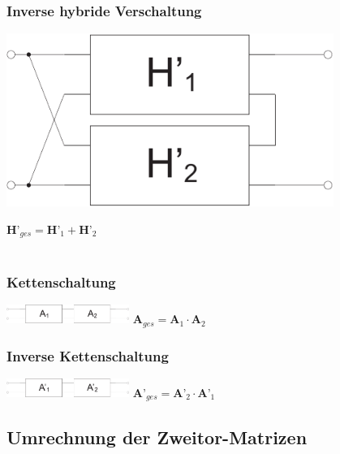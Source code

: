 \documentclass[a4paper,twocolumn,10pt]{article}
\begin{document}
\subsubsection*{Inverse hybride Verschaltung}
\begin{minipage}[b]{0.23\textwidth}
\includegraphics[width=0.8\textwidth]{Grafiken/Zweitor_inversHybrid}
\end{minipage}
\hfill
\begin{minipage}[b]{0.23\textwidth}
$\textbf{H'}_{ges}=\textbf{H'}_1+\textbf{H'}_2$\\\\
\end{minipage}

\subsubsection*{Kettenschaltung}
\includegraphics[width=0.3\textwidth, keepaspectratio]{Grafiken/Zweitor_Kette}
$\textbf{A}_{ges}=\textbf{A}_1\cdot \textbf{A}_2$

\subsubsection*{Inverse Kettenschaltung}
\includegraphics[width=0.3\textwidth]{Grafiken/Zweitor_inversKette}
$\textbf{A'}_{ges}=\textbf{A'}_2\cdot \textbf{A'}_1$

\subsection*{Umrechnung der Zweitor-Matrizen}
\end{document}
